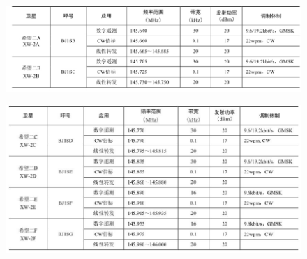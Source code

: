 \documentclass[12pt,UTF8]{ctexbook}
\begin{document}
\begin{figure}[htbp]
	\centering
	\includegraphics[width=0.7\linewidth]{94}
	\caption{}
	\label{fig:1}
\end{figure}

\begin{figure}[htbp]
	\centering
	\includegraphics[width=0.7\linewidth]{95}
	\caption{}
	\label{fig:1}
\end{figure}
\end{document}
